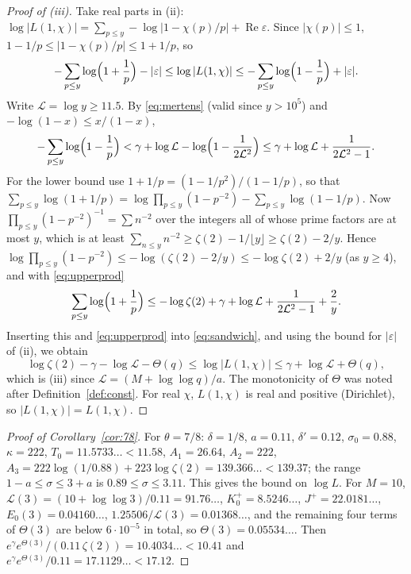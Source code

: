 \documentclass[11pt]{article}
\theoremstyle{definition}
\theoremstyle{remark}
\numberwithin{equation}{section}
\newcommand{\Rea}{\operatorname{Re}}
\newcommand{\eps}{\varepsilon}
\begin{document}
\begin{proof}[Proof of \textup{(iii)}]
Take real parts in (ii): $\log|L(1,\chi)|=\sum_{p\le y}-\log|1-\chi(p)/p|+\Rea\eps$. Since $|\chi(p)|\le1$, $1-1/p\le|1-\chi(p)/p|\le1+1/p$, so
\begin{equation}\label{eq:sandwich}
 -\sum_{p\le y}\log\Bigl(1+\frac1p\Bigr)-|\eps|\le\log|L(1,\chi)|\le-\sum_{p\le y}\log\Bigl(1-\frac1p\Bigr)+|\eps| .
\end{equation}
Write $\mathcal L=\log y\ge11.5$. By \eqref{eq:mertens} (valid since $y>10^5$) and $-\log(1-x)\le x/(1-x)$,
\begin{equation}\label{eq:upperprod}
 -\sum_{p\le y}\log\Bigl(1-\frac1p\Bigr)<\gamma+\log\mathcal L-\log\Bigl(1-\frac1{2\mathcal L^2}\Bigr)\le\gamma+\log\mathcal L+\frac1{2\mathcal L^2-1} .
\end{equation}
For the lower bound use $1+1/p=(1-1/p^2)/(1-1/p)$, so that $\sum_{p\le y}\log(1+1/p)=\log\prod_{p\le y}(1-p^{-2})-\sum_{p\le y}\log(1-1/p)$. Now $\prod_{p\le y}(1-p^{-2})^{-1}=\sum n^{-2}$ over the integers all of whose prime factors are at most $y$, which is at least $\sum_{n\le y}n^{-2}\ge\zeta(2)-1/\lfloor y\rfloor\ge\zeta(2)-2/y$. Hence $\log\prod_{p\le y}(1-p^{-2})\le-\log(\zeta(2)-2/y)\le-\log\zeta(2)+2/y$ (as $y\ge4$), and with \eqref{eq:upperprod}
\[
 \sum_{p\le y}\log\Bigl(1+\frac1p\Bigr)\le-\log\zeta(2)+\gamma+\log\mathcal L+\frac1{2\mathcal L^2-1}+\frac2y .
\]
Inserting this and \eqref{eq:upperprod} into \eqref{eq:sandwich}, and using the bound for $|\eps|$ of (ii), we obtain
\[
 \log\zeta(2)-\gamma-\log\mathcal L-\Theta(q)\le\log|L(1,\chi)|\le\gamma+\log\mathcal L+\Theta(q),
\]
which is (iii) since $\mathcal L=(M+\log\log q)/a$. The monotonicity of $\Theta$ was noted after Definition~\ref{def:const}. For real $\chi$, $L(1,\chi)$ is real and positive (Dirichlet), so $|L(1,\chi)|=L(1,\chi)$.
\end{proof}

\begin{proof}[Proof of Corollary~\ref{cor:78}]
For $\theta=7/8$: $\delta=1/8$, $a=0.11$, $\delta'=0.12$, $\sigma_0=0.88$, $\kappa=222$, $T_0=11.5733\ldots<11.58$, $A_1=26.64$, $A_2=222$, $A_3=222\log(1/0.88)+223\log\zeta(2)=139.366\ldots<139.37$; the range $1-a\le\sigma\le3+a$ is $0.89\le\sigma\le3.11$. This gives the bound on $\log L$. For $M=10$, $\mathcal L(3)=(10+\log\log3)/0.11=91.76\ldots$, $K_0^+=8.5246\ldots$, $J^+=22.0181\ldots$, $E_0(3)=0.04160\ldots$, $1.25506/\mathcal L(3)=0.01368\ldots$, and the remaining four terms of $\Theta(3)$ are below $6\cdot10^{-5}$ in total, so $\Theta(3)=0.05534\ldots$. Then $e^{\gamma}e^{\Theta(3)}/(0.11\,\zeta(2))=10.4034\ldots<10.41$ and $e^{\gamma}e^{\Theta(3)}/0.11=17.1129\ldots<17.12$.
\end{proof}
\end{document}
